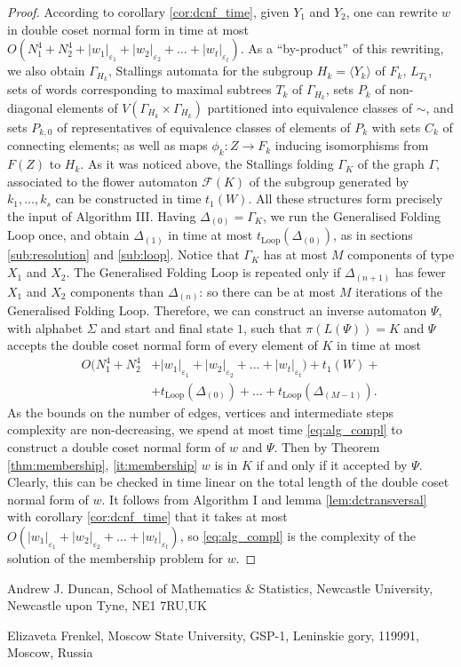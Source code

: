 \documentclass[a4paper,12pt]{article}
\newcommand{\G}{\Gamma }
\newcommand{\D}{\Delta }
\newcommand{\e}{\varepsilon }
\newcommand{\cF}{{\cal{F}}}
\numberwithin{equation}{section}
\numberwithin{figure}{section}
\newcommand{\Loop}{\operatorname{Loop}}
\renewcommand{\cF}{\mathcal{F}}
\newcommand{\la}{\langle}
\newcommand{\ra}{\rangle}
\newcommand{\maps}{\rightarrow}
\begin{document}
\begin{proof}
According to corollary \ref{cor:dcnf_time}, given $Y_1$ and $Y_2$, one can rewrite $w$ in double coset normal form in time at most 
$O(N_1^4 + N_2^4+ |w_1|_{\e_1}+|w_2|_{\e_2}+
\ldots +|w_t|_{\e_t}).$
 As a ``by-product'' of this rewriting, we also obtain $\G_{H_k}$, Stallings automata for the subgroup $H_k=\la Y_k\ra$ of $F_k$,
$L_{T_k}$, sets of words corresponding to maximal subtrees $T_k$ of $\G_{H_k}$,  sets $P_k$ of non-diagonal elements of $V( \G_{H_k}\times \G_{H_k})$
partitioned into equivalence classes of $\sim$, and sets $P_{k,0}$ of representatives of equivalence classes of
elements of $P_k$ with sets $C_k$ of connecting elements; as well as 
maps $\phi_k:Z\maps F_k$ inducing isomorphisms from $F(Z)$ to $H_k$. 
As it was noticed above, the Stallings folding $\G_K$ of the graph $\G$, associated to
the flower automaton $\cF(K)$ of the subgroup generated by $k_1, \ldots , k_s$ can be constructed in time  $t_1(W)$.
All these structures form precisely the input of Algorithm III. Having $\D_{(0)} = \G_K$, we run the Generalised Folding Loop once, and obtain $\D_{(1)}$ in time at most $t_{\Loop}(\D_{(0)})$, as in sections \ref{sub:resolution} and \ref{sub:loop}. 
Notice that $\G_K$ has at
most $M$ components of type $X_1$ and $X_2$.
 The Generalised Folding Loop is repeated
 only if $\D_{(n+1)}$ has fewer  $X_1$ and $X_2$ components
than $\D_{(n)}$: so there can be at most $M$ iterations of the Generalised
Folding Loop. Therefore, we can construct an inverse automaton 
 $\Psi$, with alphabet $\Sigma$ and start
and final state $1$, such that $\pi(L(\Psi))=K$ and $\Psi$ accepts the
double coset normal form of every element of $K$ in time at most 
\begin{align*}
O(N_1^4 + N_2^4 & + |w_1|_{\e_1}+|w_2|_{\e_2}+
\ldots +|w_t|_{\e_t})+ t_1(W) +\\ &+ t_{\Loop}(\D_{(0)}) + \ldots + t_{\Loop}(\D_{(M-1)}).
\end{align*}
As the bounds on the number of
edges, vertices and intermediate steps complexity are non-decreasing, we spend at most time \eqref{eq:alg_compl} to construct a double coset normal form of $w$ and $\Psi$. 
Then by Theorem \ref{thm:membership}, \ref{it:membership} $w$ is in $K$ if and only if it accepted by $\Psi$. Clearly, this can be checked in time linear on the total length of the double coset normal form of $w$. It follows from Algorithm I and lemma \ref{lem:dctransversal} with corollary \ref{cor:dcnf_time} that it takes at most $O(|w_1|_{\e_1}+|w_2|_{\e_2}+
\ldots +|w_t|_{\e_t})$, so \eqref{eq:alg_compl} is the complexity of the solution of the membership problem for $w$.
\end{proof}




\medskip
\noindent\textsf{Andrew J. Duncan, School of Mathematics \&
Statistics, Newcastle University, Newcastle upon Tyne, NE1 7RU,UK}


\noindent \textsf{Elizaveta Frenkel, Moscow State University,
GSP-1, Leninskie gory, 119991, Moscow, Russia}

\end{document}
